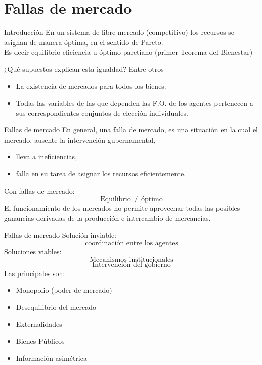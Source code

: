 \section{Fallas de mercado}
\begin{frame}{Introducción}
En un sistema de libre mercado (competitivo) los recursos se asignan de manera óptima, en el sentido de Pareto. \\[0.3cm]

Es decir equilibrio eficiencia u óptimo paretiano (primer Teorema del Bienestar)
\end{frame}
\begin{frame}{¿Qué supuestos explican esta igualdad?}
Entre otros
	\begin{itemize}
		\item La existencia de mercados para todos los bienes.
		\item Todas las variables de las que dependen las F.O. de los agentes pertenecen a sus correspondientes conjuntos de elección individuales.
	\end{itemize}
\end{frame}
\begin{frame}{Fallas de mercado}
En general, una falla de mercado, es una situación en la cual el mercado, ausente la intervención gubernamental,
	\begin{itemize}
		\item lleva a ineficiencias,
		\item falla en su tarea de asignar los recursos eficientemente.
	\end{itemize}
Con fallas de mercado:
	$$\text{Equilibrio } \neq \text{ óptimo}$$
El funcionamiento de los mercados no permite aprovechar todas las posibles ganancias derivadas de la producción e intercambio de mercancías.
\end{frame}
\begin{frame}{Fallas de mercado}
Solución inviable:
	$$\text{coordinación entre los agentes}$$
Soluciones viables:
	$$\text{Mecanismos institucionales}$$
	$$\text{Intervención del gobierno}$$
Las principales son:
	\begin{itemize}
		\item Monopolio (poder de mercado)
		\item Desequilibrio del mercado
		\item Externalidades
		\item Bienes Públicos
		\item Información asimétrica
	\end{itemize}
	\pause
	\vspace{-1.7cm}
\end{frame}
